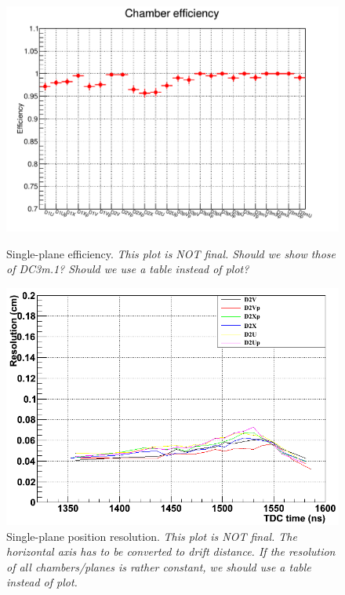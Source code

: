 \begin{figure}\centering
  \begin{minipage}[t]{0.50\linewidth}
    \includegraphics[width=\linewidth]{figures/cham_eff.pdf}
    \caption{Single-plane efficiency.
      {\it This plot is NOT final.  Should we show those of DC3m.1?
        Should we use a table instead of plot?}
    }
    \label{fig:cham:eff}
  \end{minipage}
  \begin{minipage}[t]{0.45\linewidth}
    \includegraphics[width=\linewidth]{figures/cham_reso}
    \caption{Single-plane position resolution.
      {\it This plot is NOT final.
        The horizontal axis has to be converted to drift distance.
        If the resolution of all chambers/planes is rather constant,
        we should use a table instead of plot.
    }}
    \label{fig:cham:reso}
  \end{minipage}
\end{figure}

